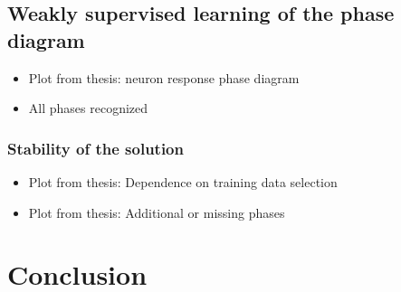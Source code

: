 \documentclass[pre, reprint, draft, twocolumn]{revtex4-1}
\begin{document}
	\subsection{Weakly supervised learning of the phase diagram}
	\begin{itemize}
		\item Plot from thesis: neuron response phase diagram
		\item All phases recognized
	\end{itemize}
	\blindtext[4]
	
	\subsubsection*{Stability of the solution}
	\begin{itemize}
		\item Plot from thesis: Dependence on training data selection
		\item Plot from thesis: Additional or missing phases
	\end{itemize}
	\blindtext[3]
	
	\section{Conclusion}
	\blindtext[3]
\end{document}
